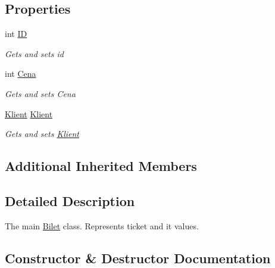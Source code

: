 \subsection*{Properties}
\begin{DoxyCompactItemize}
\item 
int \mbox{\hyperlink{class_silnik_1_1_bilet_a44f01e9fea5fc9d9942a901df1854f61}{ID}}
\begin{DoxyCompactList}\small\item\em Gets and sets id \end{DoxyCompactList}\item 
int \mbox{\hyperlink{class_silnik_1_1_bilet_ac9248d01d2d25b69868d614c3d98b814}{Cena}}
\begin{DoxyCompactList}\small\item\em Gets and sets Cena \end{DoxyCompactList}\item 
\mbox{\hyperlink{class_silnik_1_1_klient}{Klient}} \mbox{\hyperlink{class_silnik_1_1_bilet_a04776d4ea2042538d57da9f3d35f3703}{Klient}}
\begin{DoxyCompactList}\small\item\em Gets and sets \mbox{\hyperlink{class_silnik_1_1_klient}{Klient}} \end{DoxyCompactList}\end{DoxyCompactItemize}
\subsection*{Additional Inherited Members}


\subsection{Detailed Description}
The main \mbox{\hyperlink{class_silnik_1_1_bilet}{Bilet}} class. Represents ticket and it values. 



\subsection{Constructor \& Destructor Documentation}
\mbox{\label{class_silnik_1_1_bilet_ab746139c19ca9a3ba4214e2edcca628a}} 
